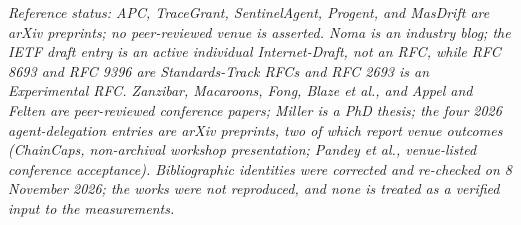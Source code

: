 \documentclass[
  10pt,
]{article}
\newcounter{none} %
\renewcommand{\_}{\allowbreak\origunderscore}
\begin{document}
\emph{Reference status: APC, TraceGrant, SentinelAgent, Progent, and
MasDrift are arXiv preprints; no peer-reviewed venue is asserted. Noma
is an industry blog; the IETF draft entry is an active individual
Internet-Draft, not an RFC, while RFC 8693 and RFC 9396 are
Standards-Track RFCs and RFC 2693 is an Experimental RFC. Zanzibar,
Macaroons, Fong, Blaze et al., and Appel and Felten are peer-reviewed
conference papers; Miller is a PhD thesis; the four 2026
agent-delegation entries are arXiv preprints, two of which report venue
outcomes (ChainCaps, non-archival workshop presentation; Pandey et al.,
venue-listed conference acceptance). Bibliographic identities were
corrected and re-checked on 8 November 2026; the works were not
reproduced, and none is treated as a verified input to the
measurements.}
\end{document}
